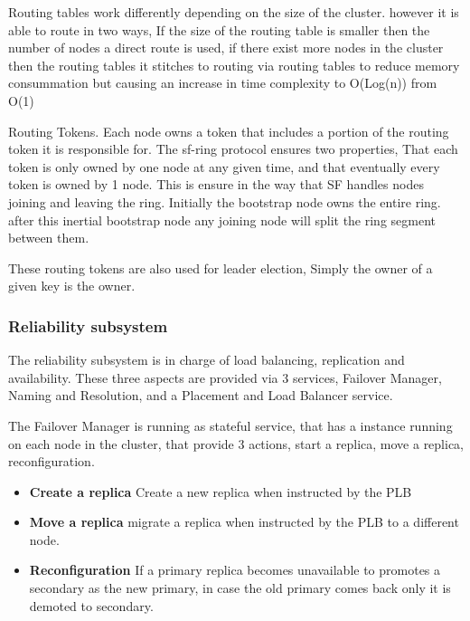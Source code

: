 \documentclass[a4paper,10pt,titlepage]{report}
\begin{document}
    Routing tables work differently depending on the size of the cluster. however it is able to route in two ways, If the size of the routing table is smaller then the number of nodes a direct route is used, if there exist more nodes in the cluster then the routing tables it stitches to routing via routing tables to reduce memory consummation but causing an increase in time complexity to O(Log(n)) from O(1)\\
    \vspace{5mm}

    Routing Tokens.
    Each node owns a token that includes a portion of the routing token it is responsible for. The sf-ring protocol ensures two properties, That each token is only owned by one node at any given time, and that eventually every token is owned by 1 node. This is ensure in the way that SF handles nodes joining and leaving the ring. Initially the bootstrap node owns the entire ring. after this inertial bootstrap node any joining node will split the ring segment between them.\\
    \vspace{5mm}


    These routing tokens are also used for leader election, Simply the owner of a given key is the owner.

    \subsubsection{Reliability subsystem}
    The reliability subsystem is in charge of load balancing, replication and availability. These three aspects are provided via 3 services, Failover Manager, Naming and Resolution, and a Placement and Load Balancer service.\\
    \vspace{5mm}

    The Failover Manager is running as stateful service, that has a instance running on each node in the cluster, that provide 3 actions, start a replica, move a replica, reconfiguration.\\
    \vspace{5mm}

    \begin{itemize}
        \item \textbf{Create a replica} Create a new replica when instructed by the PLB
        \item \textbf{Move a replica} migrate a replica when instructed by the PLB to a different node.
        \item \textbf{Reconfiguration} If a primary replica becomes unavailable to promotes a secondary as the new primary, in case the old primary comes back only it is demoted to secondary.
    \end{itemize}
\end{document}

